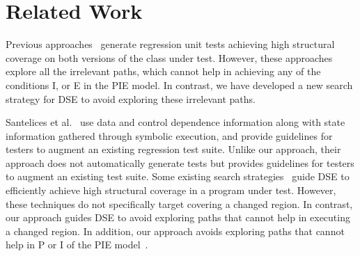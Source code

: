 
\section{Related Work}
\label{sec:related}
Previous approaches~\cite{evans:DiffTest07, taneja08:diffgen} generate regression unit tests achieving high structural coverage on both versions of the class under test. However, these approaches explore all the irrelevant paths, which cannot help in achieving any of the conditions I, or E in the PIE model. In contrast, we have developed a new search strategy for DSE to avoid exploring these irrelevant paths. 


Santelices et al.~\cite{Apiwattanapong2006AUG, santelices08sep} use data and control dependence information along with state information gathered through symbolic execution, and provide guidelines for testers to augment an existing regression test suite. Unlike our approach, their approach does not automatically generate tests but provides guidelines for testers to augment an existing test suite. 
Some existing search strategies~\cite{burnim, fitnex} guide DSE to efficiently achieve high structural coverage in a program under test. However,
these techniques do not specifically target covering a changed region. In contrast, our approach guides DSE to avoid exploring paths that cannot help in executing a changed region. In addition, our approach avoids exploring paths that cannot help in P or I of the PIE model~\cite{voas}.

